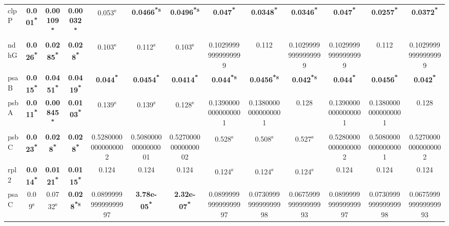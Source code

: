 \documentclass[a4paper]{article}
\begin{document}
\begin{longtable}{l|c|c|c|c|c|c|c|c|c|c|c|c}
clpP&\textbf{0.001\textsuperscript{*}}&\textbf{0.00109\textsuperscript{*}}&\textbf{0.00032\textsuperscript{*}}&0.053\textsuperscript{s}&\textbf{0.0466\textsuperscript{*}\textsuperscript{s}}&\textbf{0.0496\textsuperscript{*}\textsuperscript{s}}&\textbf{0.047\textsuperscript{*}}&\textbf{0.0348\textsuperscript{*}}&\textbf{0.0346\textsuperscript{*}}&\textbf{0.047\textsuperscript{*}}&\textbf{0.0257\textsuperscript{*}}&\textbf{0.0372\textsuperscript{*}}\\
ndhG&\textbf{0.026\textsuperscript{*}}&\textbf{0.0285\textsuperscript{*}}&\textbf{0.028\textsuperscript{*}}&0.103\textsuperscript{s}&0.112\textsuperscript{s}&0.103\textsuperscript{s}&0.10299999999999999&0.112&0.10299999999999999&0.10299999999999999&0.112&0.10299999999999999\\
psaB&\textbf{0.015\textsuperscript{*}}&\textbf{0.0451\textsuperscript{*}}&\textbf{0.0419\textsuperscript{*}}&\textbf{0.044\textsuperscript{*}}&\textbf{0.0454\textsuperscript{*}}&\textbf{0.0414\textsuperscript{*}}&\textbf{0.044\textsuperscript{*}\textsuperscript{s}}&\textbf{0.0456\textsuperscript{*}\textsuperscript{s}}&\textbf{0.042\textsuperscript{*}\textsuperscript{s}}&\textbf{0.044\textsuperscript{*}}&\textbf{0.0456\textsuperscript{*}}&\textbf{0.042\textsuperscript{*}}\\
psbA&\textbf{0.011\textsuperscript{*}}&\textbf{0.00845\textsuperscript{*}}&\textbf{0.0103\textsuperscript{*}}&0.139\textsuperscript{s}&0.139\textsuperscript{s}&0.128\textsuperscript{s}&0.13900000000000001&0.13800000000000001&0.128&0.13900000000000001&0.13800000000000001&0.128\\
psbC&\textbf{0.023\textsuperscript{*}}&\textbf{0.028\textsuperscript{*}}&\textbf{0.028\textsuperscript{*}}&0.52800000000000002&0.50800000000000001&0.52700000000000002&0.528\textsuperscript{s}&0.508\textsuperscript{s}&0.527\textsuperscript{s}&0.52800000000000002&0.50800000000000001&0.52700000000000002\\
rpl2&\textbf{0.014\textsuperscript{*}}&\textbf{0.0121\textsuperscript{*}}&\textbf{0.0115\textsuperscript{*}}&0.124&0.124&0.124&0.124\textsuperscript{s}&0.124\textsuperscript{s}&0.124\textsuperscript{s}&0.124&0.124&0.124\\
psaC&0.09\textsuperscript{s}&0.0732\textsuperscript{s}&\textbf{0.028\textsuperscript{*}\textsuperscript{s}}&0.089999999999999997&\textbf{3.78e-05\textsuperscript{*}}&\textbf{2.32e-07\textsuperscript{*}}&0.089999999999999997&0.073099999999999998&0.067599999999999993&0.089999999999999997&0.073099999999999998&0.067599999999999993\\

\end{longtable}
\end{document}
